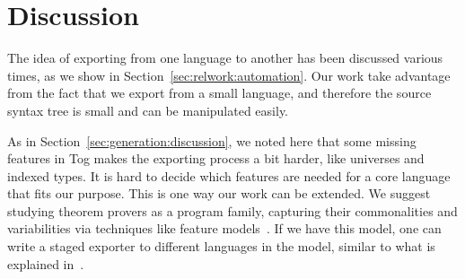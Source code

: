 
\section{Discussion}
\label{sec:exporting:discussion}
The idea of exporting from one language to another has been discussed various times, as we show in Section~\ref{sec:relwork:automation}. Our work take advantage from the fact that we export from a small language, and therefore the source syntax tree is small and can be manipulated easily.  

As in Section~\ref{sec:generation:discussion}, we noted here that some missing features in Tog makes the exporting process a bit harder, like universes and indexed types. It is hard to decide which features are needed for a core language that fits our purpose. This is one way our work can be extended. We suggest studying theorem provers as a program family, capturing their commonalities and variabilities via techniques like feature models~\cite{czarnecki2000generative}. If we have this model, one can write a staged exporter to different languages in the model, similar to what is explained in~\cite{stagedConfig}. 


